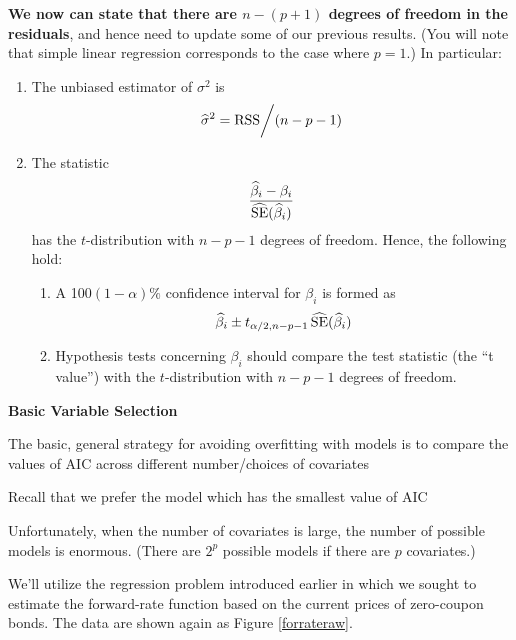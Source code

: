\documentclass{report}
\begin{document}
%

\newpage
{\bf We now can state that there are $n-(p+1)$ degrees of freedom in the residuals}, and hence need to
update some of our previous results. (You will note that simple linear regression corresponds to
the case where $p=1$.) In particular:

\vspace{-.4in}
\begin{enumerate}
\item The unbiased estimator of $\sigma^2$ is
\[
   \widehat \sigma^2 = {\rm RSS}\bigg/(n-p-1)
\]
\item The statistic
\[
   \frac{\widehat \beta_i - \beta_i}{\widehat {\rm SE}(\widehat \beta_i)}
\]
has the $t$-distribution with $n-p-1$ degrees of freedom. Hence, the following hold:
\begin{enumerate}
\item A 100$(1-\alpha)\%$ confidence interval for $\beta_i$ is formed as
\[
   \widehat \beta_i \pm t_{\alpha/2, n-p-1} \,\widehat {\rm SE}(\widehat \beta_i)
\]
\item Hypothesis tests concerning $\beta_i$ should compare the test statistic
(the ``t value'') with the $t$-distribution with $n-p-1$ degrees of freedom.
\end{enumerate}
\end{enumerate}


\newpage
\makerule

{\bf \LARGE Basic Variable Selection}

The basic, general strategy for avoiding overfitting with models 
is to compare the values of AIC across different number/choices of
covariates

Recall that we prefer the model which has the smallest value of AIC

Unfortunately, when the number of covariates is large, the
number of possible models is enormous. (There are $2^p$ possible models
if there are $p$ covariates.)


\newpage

We'll utilize the regression problem introduced earlier in which
we sought to estimate the forward-rate function based on the current
prices of zero-coupon bonds. The data are shown again as Figure
\ref{forrateraw}.
\end{document}
